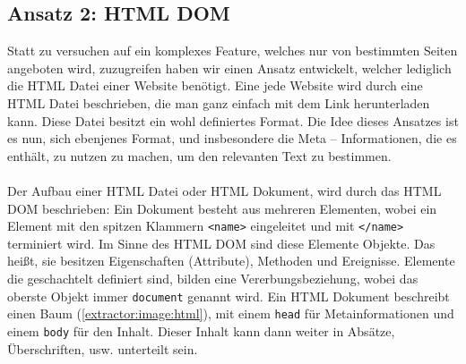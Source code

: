 \subsection[HTML DOM]{Ansatz 2: HTML DOM} %
\label{extractor:ansatz:subsec2}
Statt zu versuchen auf ein komplexes Feature, welches nur von bestimmten Seiten angeboten wird, zuzugreifen haben wir einen Ansatz entwickelt, welcher lediglich die HTML Datei einer Website benötigt. Eine jede Website wird durch eine HTML Datei beschrieben, die man ganz einfach mit dem Link herunterladen kann.
Diese Datei besitzt ein wohl definiertes Format. Die Idee dieses Ansatzes ist es nun, sich ebenjenes Format, und insbesondere die Meta – Informationen, die es enthält, zu nutzen zu machen, um den relevanten Text zu bestimmen. \\ \\ 
Der Aufbau einer HTML Datei oder HTML Dokument, wird durch das \ac{HTML DOM} beschrieben: Ein Dokument besteht aus mehreren Elementen, wobei ein Element mit den spitzen Klammern \texttt{<name>} eingeleitet und mit \texttt{</name>} terminiert wird. Im Sinne des \ac{HTML DOM} sind diese Elemente Objekte. Das heißt, sie besitzen Eigenschaften (Attribute), Methoden und Ereignisse. \cite{w3c_html} Elemente die geschachtelt definiert sind, bilden eine Vererbungsbeziehung, wobei das oberste Objekt immer \verb|document| genannt wird. Ein HTML Dokument beschreibt einen Baum (\autoref{extractor:image:html}), mit einem \verb|head| für Metainformationen und einem \verb|body| für den Inhalt. Dieser Inhalt kann dann weiter in Absätze, Überschriften, usw. unterteilt sein.  
